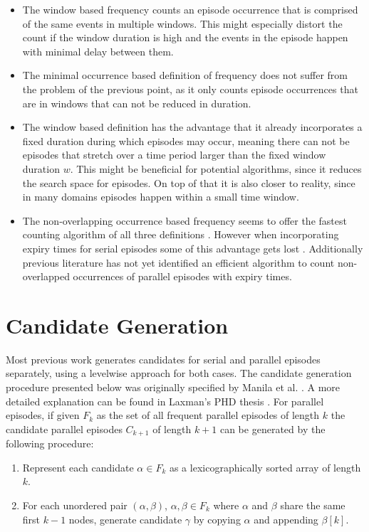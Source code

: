 \begin{itemize}
	\item The window based frequency counts an episode occurrence that is comprised of the same events in multiple windows. This might especially distort the count if the window duration is high and the events in the episode happen with minimal delay between them.
	\item The minimal occurrence based definition of frequency does not suffer from the problem of the previous point, as it only counts episode occurrences that are in windows that can not be reduced in duration.
	\item The window based definition has the advantage that it already incorporates a fixed duration during which episodes may occur, meaning there can not be episodes that stretch over a time period larger than the fixed window duration $w$. This might be beneficial for potential algorithms, since it reduces the search space for episodes. On top of that it is also closer to reality, since in many domains episodes happen within a small time window.
	\item The non-overlapping occurrence based frequency seems to offer the fastest counting algorithm of all three definitions \cite{laxman2007fast}. However when incorporating expiry times for serial episodes some of this advantage gets lost \cite{laxman2006discovering}. Additionally previous literature has not yet identified an efficient algorithm to count non-overlapped occurrences of parallel episodes with expiry times. 
\end{itemize}

\section{Candidate Generation}
\label{sec_candidateGen}
Most previous work generates candidates for serial and parallel episodes separately, using a levelwise approach for both cases. The candidate generation procedure presented below was originally specified by Manila et al. \cite{mannila1997discovery}. A more detailed explanation can be found in Laxman's PHD thesis \cite{laxman2006discovering}. \newline
For parallel episodes, if given $F_k$ as the set of all frequent parallel episodes of length $k$ the candidate parallel episodes $C_{k+1}$ of length $k+1$ can be generated by the following procedure:

\begin{enumerate}
	\item Represent each candidate $\alpha \in F_k$ as a lexicographically sorted array of length $k$.
	\item For each unordered pair $(\alpha , \beta )$, $\alpha ,\beta \in F_k$ where $\alpha$ and $\beta$ share the same first $k-1$ nodes, generate candidate $\gamma$ by copying $\alpha$ and appending $\beta [k]$.
\end{enumerate}

